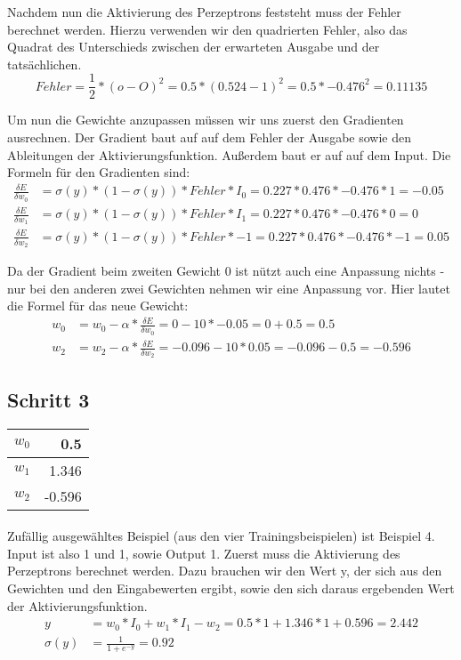 \documentclass[a4paper]{article}
\begin{document}
Nachdem nun die Aktivierung des Perzeptrons feststeht muss der Fehler berechnet werden. Hierzu verwenden wir den quadrierten Fehler, also das Quadrat des Unterschieds zwischen der erwarteten Ausgabe und der tatsächlichen.
\[
	Fehler = \frac{1}{2} * (o - O)^2 = 0.5 * (0.524 - 1)^2 = 0.5 * -0.476^2 = 0.11135
\]

Um nun die Gewichte anzupassen müssen wir uns zuerst den Gradienten ausrechnen.
Der Gradient baut auf auf dem Fehler der Ausgabe sowie den Ableitungen der Aktivierungsfunktion. Außerdem baut er auf auf dem Input. Die Formeln für den Gradienten sind:
\begin{align*}
	\frac{\delta E}{\delta w_0} &= \sigma(y) * (1 - \sigma(y)) * Fehler * I_0 = 0.227 * 0.476 * -0.476 * 1 = -0.05 \\
	\frac{\delta E}{\delta w_1} &= \sigma(y) * (1 - \sigma(y)) * Fehler * I_1 = 0.227 * 0.476 * -0.476 * 0 = 0 \\
	\frac{\delta E}{\delta w_2} &= \sigma(y) * (1 - \sigma(y)) * Fehler * -1 = 0.227 * 0.476 * -0.476 * -1 = 0.05
\end{align*}

Da der Gradient beim zweiten Gewicht 0 ist nützt auch eine Anpassung nichts - nur bei den anderen zwei Gewichten nehmen wir eine Anpassung vor. Hier lautet die Formel für das neue Gewicht:
\begin{align*}
	w_0 &= w_0 - \alpha * \frac{\delta E}{\delta w_0} = 0 - 10 * -0.05 = 0 + 0.5 = 0.5 \\
	w_2 &= w_2 - \alpha * \frac{\delta E}{\delta w_2} = -0.096 - 10 * 0.05 = -0.096 - 0.5 = -0.596
\end{align*}

\subsection{Schritt 3}
\begin{tabular}{|l|r|}
	\hline
	$w_0$ & 0.5 \\\hline
	$w_1$ & 1.346 \\\hline
	$w_2$ & -0.596 \\\hline
\end{tabular}
\paragraph{}
Zufällig ausgewähltes Beispiel (aus den vier Trainingsbeispielen) ist Beispiel 4. Input ist also 1 und 1, sowie Output 1.
Zuerst muss die Aktivierung des Perzeptrons berechnet werden. Dazu brauchen wir den Wert y, der sich aus den Gewichten und den Eingabewerten ergibt, sowie den sich daraus ergebenden Wert der Aktivierungsfunktion.
\begin{align*}
	y &= w_0 * I_0 + w_1 * I_1 - w_2 = 0.5 * 1 + 1.346 * 1 + 0.596 = 2.442 \\
	\sigma(y) &= \frac{1}{1 + e^{-y}} = 0.92
\end{align*}
\end{document}
